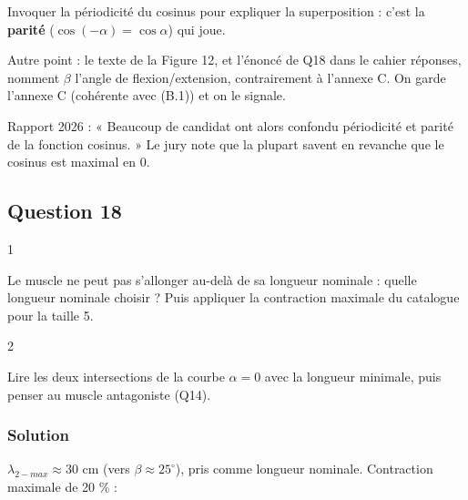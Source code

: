 \documentclass[11pt,a4paper]{article}
\newcommand{\equationajustee}[1]{%
  \sbox{\boiteequation}{$\displaystyle #1$}%
  \ifdim\wd\boiteequation>\linewidth
    \[\resizebox{\linewidth}{!}{\usebox{\boiteequation}}\]%
  \else
    \[#1\]%
  \fi}
\begin{document}
\begin{piege}

Invoquer la périodicité du cosinus pour expliquer la superposition : c'est la \textbf{parité} (\(\cos(-\alpha)=\cos\alpha\)) qui joue.

Autre point : le texte de la Figure 12, et l'énoncé de Q18 dans le cahier réponses, nomment \(\beta\) l'angle de flexion/extension, contrairement à l'annexe C. On garde l'annexe C (cohérente avec (B.1)) et on le signale.

\end{piege}

\begin{jury}

Rapport 2026 : « Beaucoup de candidat ont alors confondu périodicité et parité de la fonction cosinus. » Le jury note que la plupart savent en revanche que le cosinus est maximal en 0.

\end{jury}

\hypertarget{question-18}{%
\subsection{Question 18}\label{question-18}}

\begin{indication}{1}

Le muscle ne peut pas s'allonger au-delà de sa longueur nominale : quelle longueur nominale choisir ? Puis appliquer la contraction maximale du catalogue pour la taille 5.

\end{indication}

\begin{indication}{2}

Lire les deux intersections de la courbe \(\alpha=0\) avec la longueur minimale, puis penser au muscle antagoniste (Q14).

\end{indication}

\hypertarget{solution-17}{%
\subsubsection{Solution}\label{solution-17}}

\(\lambda_{2-max}\approx30\) cm (vers \(\beta\approx25^\circ\)), pris comme longueur nominale. Contraction maximale de 20 \% :

\equationajustee{\begin{aligned}
\lambda_{2-min}&=0{,}8\times30\\
&=24\ \mathrm{cm}
\end{aligned}}
\end{document}
